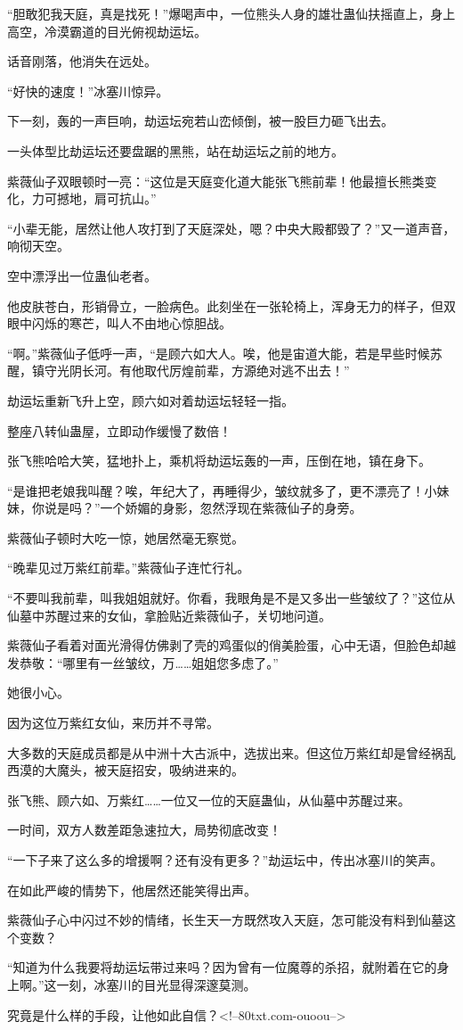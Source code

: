 \begin{this_body}
“胆敢犯我天庭，真是找死！”爆喝声中，一位熊头人身的雄壮蛊仙扶摇直上，身上高空，冷漠霸道的目光俯视劫运坛。

话音刚落，他消失在远处。

“好快的速度！”冰塞川惊异。

下一刻，轰的一声巨响，劫运坛宛若山峦倾倒，被一股巨力砸飞出去。

一头体型比劫运坛还要盘踞的黑熊，站在劫运坛之前的地方。

紫薇仙子双眼顿时一亮：“这位是天庭变化道大能张飞熊前辈！他最擅长熊类变化，力可撼地，肩可抗山。”

“小辈无能，居然让他人攻打到了天庭深处，嗯？中央大殿都毁了？”又一道声音，响彻天空。

空中漂浮出一位蛊仙老者。

他皮肤苍白，形销骨立，一脸病色。此刻坐在一张轮椅上，浑身无力的样子，但双眼中闪烁的寒芒，叫人不由地心惊胆战。

“啊。”紫薇仙子低呼一声，“是顾六如大人。唉，他是宙道大能，若是早些时候苏醒，镇守光阴长河。有他取代厉煌前辈，方源绝对逃不出去！”

劫运坛重新飞升上空，顾六如对着劫运坛轻轻一指。

整座八转仙蛊屋，立即动作缓慢了数倍！

张飞熊哈哈大笑，猛地扑上，乘机将劫运坛轰的一声，压倒在地，镇在身下。

“是谁把老娘我叫醒？唉，年纪大了，再睡得少，皱纹就多了，更不漂亮了！小妹妹，你说是吗？”一个娇媚的身影，忽然浮现在紫薇仙子的身旁。

紫薇仙子顿时大吃一惊，她居然毫无察觉。

“晚辈见过万紫红前辈。”紫薇仙子连忙行礼。

“不要叫我前辈，叫我姐姐就好。你看，我眼角是不是又多出一些皱纹了？”这位从仙墓中苏醒过来的女仙，拿脸贴近紫薇仙子，关切地问道。

紫薇仙子看着对面光滑得仿佛剥了壳的鸡蛋似的俏美脸蛋，心中无语，但脸色却越发恭敬：“哪里有一丝皱纹，万……姐姐您多虑了。”

她很小心。

因为这位万紫红女仙，来历并不寻常。

大多数的天庭成员都是从中洲十大古派中，选拔出来。但这位万紫红却是曾经祸乱西漠的大魔头，被天庭招安，吸纳进来的。

张飞熊、顾六如、万紫红……一位又一位的天庭蛊仙，从仙墓中苏醒过来。

一时间，双方人数差距急速拉大，局势彻底改变！

“一下子来了这么多的增援啊？还有没有更多？”劫运坛中，传出冰塞川的笑声。

在如此严峻的情势下，他居然还能笑得出声。

紫薇仙子心中闪过不妙的情绪，长生天一方既然攻入天庭，怎可能没有料到仙墓这个变数？

“知道为什么我要将劫运坛带过来吗？因为曾有一位魔尊的杀招，就附着在它的身上啊。”这一刻，冰塞川的目光显得深邃莫测。

究竟是什么样的手段，让他如此自信？<!--80txt.com-ouoou-->

\end{this_body}

